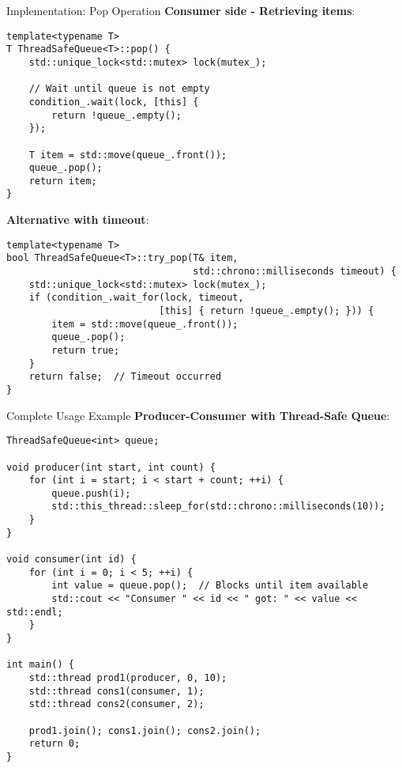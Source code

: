 \begin{frame}[fragile]{Implementation: Pop Operation}
	\textbf{Consumer side - Retrieving items}:

	\begin{verbatim}
template<typename T>
T ThreadSafeQueue<T>::pop() {
    std::unique_lock<std::mutex> lock(mutex_);

    // Wait until queue is not empty
    condition_.wait(lock, [this] {
        return !queue_.empty();
    });

    T item = std::move(queue_.front());
    queue_.pop();
    return item;
}
	\end{verbatim}

	\textbf{Alternative with timeout}:
	\begin{verbatim}
template<typename T>
bool ThreadSafeQueue<T>::try_pop(T& item,
                                 std::chrono::milliseconds timeout) {
    std::unique_lock<std::mutex> lock(mutex_);
    if (condition_.wait_for(lock, timeout,
                           [this] { return !queue_.empty(); })) {
        item = std::move(queue_.front());
        queue_.pop();
        return true;
    }
    return false;  // Timeout occurred
}
	\end{verbatim}
\end{frame}

\begin{frame}[fragile]{Complete Usage Example}
	\textbf{Producer-Consumer with Thread-Safe Queue}:

	\begin{verbatim}
ThreadSafeQueue<int> queue;

void producer(int start, int count) {
    for (int i = start; i < start + count; ++i) {
        queue.push(i);
        std::this_thread::sleep_for(std::chrono::milliseconds(10));
    }
}

void consumer(int id) {
    for (int i = 0; i < 5; ++i) {
        int value = queue.pop();  // Blocks until item available
        std::cout << "Consumer " << id << " got: " << value << std::endl;
    }
}

int main() {
    std::thread prod1(producer, 0, 10);
    std::thread cons1(consumer, 1);
    std::thread cons2(consumer, 2);

    prod1.join(); cons1.join(); cons2.join();
    return 0;
}
	\end{verbatim}
\end{frame}

